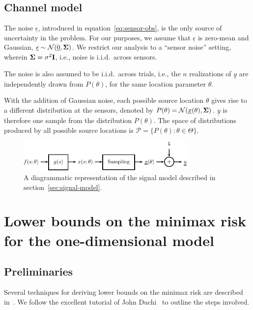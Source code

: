 \documentclass[conference]{IEEEtran}
\providecommand{\v}{}
\renewcommand{\v}[1]{\underline{#1}}
\providecommand{\m}{}
\renewcommand{\m}[1]{{\bf #1}}
\begin{document}
\subsection{Channel model}
\label{sec:channel-model}

The noise $\v \epsilon$, introduced in equation~\eqref{eq:sensor-obs}, is the
only source of uncertainty in the problem. For our purposes, we assume that $\v
\epsilon$ is zero-mean and Gaussian, $\v \epsilon \sim \mathcal{N}(\v 0, \m
\Sigma)$. We restrict our analysis to a ``sensor noise'' setting, wherein
$\m\Sigma = \sigma^2 \m I$, i.e., noise is i.i.d.\ across sensors.

The noise is also assumed to be i.i.d.\ across trials, i.e., the $n$
realizations of $\v y$ are independently drawn from $P(\theta)$, for the
same location parameter $\theta$.

With the addition of Gaussian noise, each possible source location $\theta$
gives rise to a different distribution at the sensors, denoted by $P(\theta) =
\mathcal{N}(\v x(\theta), \m \Sigma)$. $\v y$ is therefore one sample from the
distribution $P(\theta)$. The space of distributions produced by all possible
source locations is $\mathcal{P} = \{P(\theta) : \theta \in \Theta \}$.

\begin{figure}[tp] %
	\centering
	\includegraphics[width=3.5in]{block-diagram}
	\caption{A diagrammatic representation of the signal model described in
	section~\ref{sec:signal-model}.}
	\label{fig:signal-model}
\end{figure}

\section{Lower bounds on the minimax risk for the one-dimensional model}
\label{sec:minimax-lower-bounds}

\subsection{Preliminaries}

Several techniques for deriving lower bounds on the minimax risk are described
in~\cite{Tsybakov2009Introduction}. We follow the excellent tutorial of John
Duchi~\cite{Duchi2015Information} to outline the steps involved.
\end{document}
